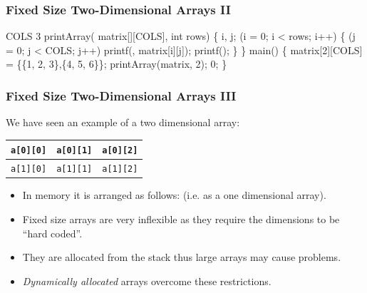\documentclass[smaller,handout,table]{beamer}
\begin{document}
\begin{frame}[fragile]
\frametitle{Fixed Size Two-Dimensional Arrays II}
\vspace{-0.2in}
\begin{semiverbatim}
\footnotesize
\kr\kl{} 
\kl{} COLS 3
\kl
\kl{} printArray( matrix[][COLS], int rows)
\kl\{
\kl   {} i, j;
\kl   {} (i = 0; i < rows; i++)
\kl   \{
\kl      {} (j = 0; j < COLS; j++)
\kl         printf(, matrix[i][j]);    
\kl      printf();
\kl   \}
\kl\}
\kl
\kl{} main()
\kl\{
\kl   {} matrix[2][COLS] = \{\{1, 2, 3\},\{4, 5, 6\}\};
\kl   printArray(matrix, 2);
\kl   {} 0;
\kl\}
\end{semiverbatim}
\end{frame}

\begin{frame}
\frametitle{Fixed Size Two-Dimensional Arrays III}
We have seen an example of a two dimensional array:
\begin{center}
\begin{tabular}{|c|c|c|}
\hline
\tt a[0][0]&\tt a[0][1]&\tt a[0][2]\\
\hline
\tt a[1][0]&\tt a[1][1]&\tt a[1][2]\\
\hline
\end{tabular}
\end{center}
\begin{itemize}
\item In memory it is arranged as follows:
(i.e. as a one dimensional array).
\item Fixed size arrays are very inflexible as they require the dimensions to be ``hard coded''.
\item They are allocated from the stack thus large arrays may cause problems.
\item \emph{Dynamically allocated} arrays overcome these restrictions.
\end{itemize}
\end{frame}
\end{document}
